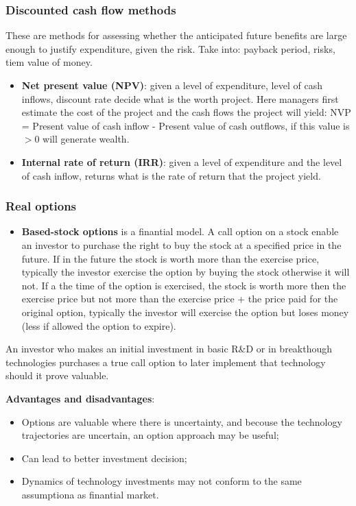 \documentclass[12pt]{article}
\begin{document}
\subsubsection{Discounted cash flow methods}
These are methods for assessing whether the anticipated future benefits are large enough to justify expenditure, given the risk.
Take into: payback period, risks, tiem value of money.
\begin{itemize}
    \item \textbf{Net present value (NPV)}: given a level of expenditure, level of cash inflows, discount rate decide what is the worth project.
    Here managers first estimate the cost of the project and the cash flows the project will yield: NVP = Present value of cash inflow - Present value of cash outflows, if this value is $>0$ will generate wealth.
    \item \textbf{Internal rate of return (IRR)}: given a level of expenditure and the level of cash inflow, returns what is the rate of return that the project yield.
\end{itemize}
\subsubsection{Real options}
\begin{itemize}
    \item \textbf{Based-stock options} is a finantial model.
    A call option on a stock enable an investor to purchase the right to buy the stock at a specified price in the future.
    If in the future the stock is worth more than the exercise price, typically the investor exercise the option by buying the stock otherwise it will not.
    If a the time of the option is exercised, the stock is worth more then the exercise price but not more than the exercise price + the price paid for the original option, typically the investor will exercise the option but loses money (less if allowed the option to expire). 
\end{itemize}
An investor who makes an initial investment in basic R\&D or in breakthough technologies purchases a true call option to later implement that technology should it prove valuable.

\textbf{Advantages and disadvantages}:
\begin{itemize}
    \item Options are valuable where there is uncertainty, and becouse the technology trajectories are uncertain, an option approach may be useful;
    \item Can lead to better investment decision;
    \item Dynamics of technology investments may not conform to the same assumptiona as finantial market.
\end{itemize}
\end{document}
